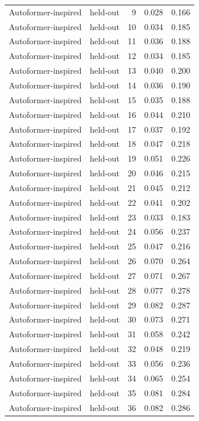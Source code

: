 \begin{tabular}{llrrr}
Autoformer-inspired & held-out & 9 & 0.028 & 0.166 \\
Autoformer-inspired & held-out & 10 & 0.034 & 0.185 \\
Autoformer-inspired & held-out & 11 & 0.036 & 0.188 \\
Autoformer-inspired & held-out & 12 & 0.034 & 0.185 \\
Autoformer-inspired & held-out & 13 & 0.040 & 0.200 \\
Autoformer-inspired & held-out & 14 & 0.036 & 0.190 \\
Autoformer-inspired & held-out & 15 & 0.035 & 0.188 \\
Autoformer-inspired & held-out & 16 & 0.044 & 0.210 \\
Autoformer-inspired & held-out & 17 & 0.037 & 0.192 \\
Autoformer-inspired & held-out & 18 & 0.047 & 0.218 \\
Autoformer-inspired & held-out & 19 & 0.051 & 0.226 \\
Autoformer-inspired & held-out & 20 & 0.046 & 0.215 \\
Autoformer-inspired & held-out & 21 & 0.045 & 0.212 \\
Autoformer-inspired & held-out & 22 & 0.041 & 0.202 \\
Autoformer-inspired & held-out & 23 & 0.033 & 0.183 \\
Autoformer-inspired & held-out & 24 & 0.056 & 0.237 \\
Autoformer-inspired & held-out & 25 & 0.047 & 0.216 \\
Autoformer-inspired & held-out & 26 & 0.070 & 0.264 \\
Autoformer-inspired & held-out & 27 & 0.071 & 0.267 \\
Autoformer-inspired & held-out & 28 & 0.077 & 0.278 \\
Autoformer-inspired & held-out & 29 & 0.082 & 0.287 \\
Autoformer-inspired & held-out & 30 & 0.073 & 0.271 \\
Autoformer-inspired & held-out & 31 & 0.058 & 0.242 \\
Autoformer-inspired & held-out & 32 & 0.048 & 0.219 \\
Autoformer-inspired & held-out & 33 & 0.056 & 0.236 \\
Autoformer-inspired & held-out & 34 & 0.065 & 0.254 \\
Autoformer-inspired & held-out & 35 & 0.081 & 0.284 \\
Autoformer-inspired & held-out & 36 & 0.082 & 0.286 \\

\end{tabular}
